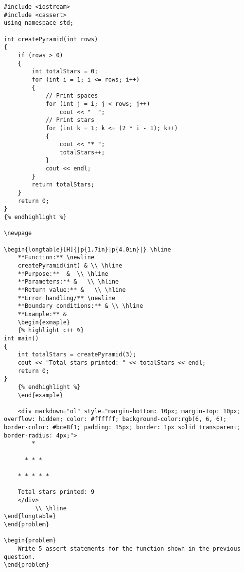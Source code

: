 {{{{{{{{{{\begin{problem}
\begin{verbatim}
#include <iostream>
#include <cassert>
using namespace std;

int createPyramid(int rows)
{
    if (rows > 0)
    {
        int totalStars = 0;
        for (int i = 1; i <= rows; i++)
        {
            // Print spaces
            for (int j = i; j < rows; j++)
                cout << "  ";
            // Print stars
            for (int k = 1; k <= (2 * i - 1); k++)
            {
                cout << "* ";
                totalStars++;
            }
            cout << endl;
        }
        return totalStars;
    }
    return 0;
}
{% endhighlight %}

\newpage

\begin{longtable}[H]{|p{1.7in}|p{4.0in}|} \hline
    **Function:** \newline 
    createPyramid(int) & \\ \hline
    **Purpose:**  &  \\ \hline
    **Parameters:** &   \\ \hline
    **Return value:** &   \\ \hline
    **Error handling/** \newline
    **Boundary conditions:** & \\ \hline
    **Example:** & 
    \begin{exmaple}
    {% highlight c++ %}    
int main()
{
    int totalStars = createPyramid(3);
    cout << "Total stars printed: " << totalStars << endl;
    return 0;
}
    {% endhighlight %}
    \end{example}

    <div markdown="ol" style="margin-bottom: 10px; margin-top: 10px; overflow: hidden; color: #ffffff; background-color:rgb(6, 6, 6); border-color: #bce8f1; padding: 15px; border: 1px solid transparent; border-radius: 4px;">
        * 
        
      * * * 
      
    * * * * * 
    
    Total stars printed: 9
    </div>
         \\ \hline
\end{longtable}
\end{problem}

\begin{problem}
    Write 5 assert statements for the function shown in the previous question.
\end{problem}


\end{verbatim}
\end{problem}}}}}}}}}}}
